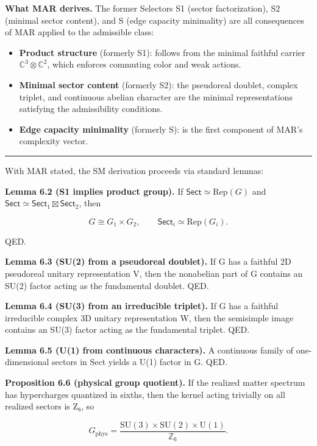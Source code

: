 \documentclass[
]{article}
\providecommand{\tightlist}{%
  \setlength{\itemsep}{0pt}\setlength{\parskip}{0pt}}
\begin{document}
\textbf{What MAR derives.} The former Selectors S1 (sector
factorization), S2 (minimal sector content), and S (edge capacity
minimality) are all consequences of MAR applied to the admissible class:

\begin{itemize}
\tightlist
\item
  \textbf{Product structure} (formerly S1): follows from the minimal
  faithful carrier \(\mathbb{C}^3 \otimes \mathbb{C}^2\), which enforces
  commuting color and weak actions.
\item
  \textbf{Minimal sector content} (formerly S2): the pseudoreal doublet,
  complex triplet, and continuous abelian character are the minimal
  representations satisfying the admissibility conditions.
\item
  \textbf{Edge capacity minimality} (formerly S): is the first component
  of MAR's complexity vector.
\end{itemize}

\begin{center}\rule{0.5\linewidth}{0.5pt}\end{center}

With MAR stated, the SM derivation proceeds via standard lemmas:

\textbf{Lemma 6.2 (S1 implies product group).} If
\(\mathsf{Sect} \simeq \mathrm{Rep}(G)\) and
\(\mathsf{Sect} \simeq \mathsf{Sect}_1 \boxtimes \mathsf{Sect}_2\), then

\[
G \cong G_1 \times G_2,
\qquad
\mathsf{Sect}_i \simeq \mathrm{Rep}(G_i).
\]

QED.

\textbf{Lemma 6.3 (SU(2) from a pseudoreal doublet).} If G has a
faithful 2D pseudoreal unitary representation V, then the nonabelian
part of G contains an SU(2) factor acting as the fundamental doublet.
QED.

\textbf{Lemma 6.4 (SU(3) from an irreducible triplet).} If G has a
faithful irreducible complex 3D unitary representation W, then the
semisimple image contains an SU(3) factor acting as the fundamental
triplet. QED.

\textbf{Lemma 6.5 (U(1) from continuous characters).} A continuous
family of one-dimensional sectors in Sect yields a U(1) factor in G.
QED.

\textbf{Proposition 6.6 (physical group quotient).} If the realized
matter spectrum has hypercharges quantized in sixths, then the kernel
acting trivially on all realized sectors is Z₆, so

\[
G_{\mathrm{phys}} = \frac{\mathrm{SU}(3)\times \mathrm{SU}(2)\times \mathrm{U}(1)}{\mathbb Z_6}.
\]
\end{document}
